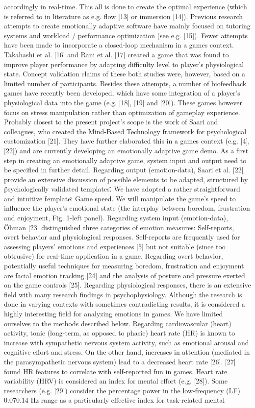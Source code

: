accordingly in real-time. This all is done to create the optimal experience (which is referred to in literature as e.g. flow [13] or immersion [14]). Previous research attempts to create emotionally adaptive software have mainly focused on tutoring systems and workload / performance optimization (see e.g. [15]). Fewer attempts have been made to incorporate a closed-loop mechanism in a games context. Takahashi et al. [16] and Rani et al. [17] created a game that was found to improve player performance by adapting difficulty level to player's physiological state. Concept validation claims of these both studies were, however, based on a limited number of participants. Besides these attempts, a number of biofeedback games have recently been developed, which have some integration of a player's physiological data into the game (e.g. [18], [19] and [20]). These games however focus on stress manipulation rather than optimization of gameplay experience. Probably closest to the present project's scope is the work of Saari and colleagues, who created the Mind-Based Technology framework for psychological customization [21]. They have further elaborated this in a games context (e.g. [4], [22]) and are currently developing an emotionally adaptive game demo. As a first step in creating an emotionally adaptive game, system input and output need to be specified in further detail. Regarding output (emotion-data), Saari et al. [22] provide an extensive discussion of possible elements to be adapted, structured by \"psychologically validated templates\". We have adopted a rather straightforward and intuitive \"template\": Game speed. We will manipulate the game's speed to influence the player's emotional state (the interplay between boredom, frustration and enjoyment, Fig. 1-left panel). Regarding system input (emotion-data), Öhman [23] distinguished three categories of emotion measures: Self-reports, overt behavior and physiological responses. Self-reports are frequently used for assessing players' emotions and experiences [5] but not suitable (since too obtrusive) for real-time application in a game. Regarding overt behavior, potentially useful techniques for measuring boredom, frustration and enjoyment are facial emotion tracking [24] and the analysis of posture and pressure exerted on the game controls [25]. Regarding physiological responses, there is an extensive field with many research findings in psychophysiology. Although the research is done in varying contexts with sometimes contradicting results, it is considered a highly interesting field for analyzing emotions in games. We have limited ourselves to the methods described below. Regarding cardiovascular (heart) activity, tonic (long-term, as opposed to phasic) heart rate (HR) is known to increase with sympathetic nervous system activity, such as emotional arousal and cognitive effort and stress. On the other hand, increases in attention (mediated in the parasympathetic nervous system) lead to a decreased heart rate [26]. [27] found HR features to correlate with self-reported fun in games. Heart rate variability (HRV) is considered an index for mental effort (e.g. [28]). Some researchers (e.g. [29]) consider the percentage power in the low-frequency (LF) 0.070.14 Hz range as a particularly effective index for task-related mental 